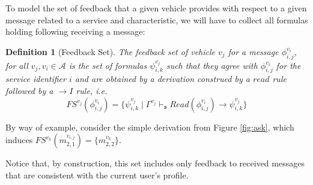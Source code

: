 \documentclass[compsoc, conference, letterpaper, 10pt, times]{IEEEtran}
\newtheorem{definition}{Definition}
\begin{document}
To model the set of feedback that a given vehicle provides with respect to a given message related to a service and characteristic, we will have to collect all formulas holding following receiving a message:

\begin{definition}[Feedback Set]
The feedback set of vehicle $v_{j}$ for a message $\phi^{v_{i}}_{i,j}$, for all $v_{j}, v_{i} \in \mathcal{A}$ is the set of formulas $\psi^{v_{j}}_{i,k}$ such that they agree with $\phi^{v_{i}}_{i,j}$ for the service identifier $i$ and are obtained by a derivation construed by a $read$ rule followed by a $\rightarrow I$ rule, i.e.
%
\[
FS^{v_{j}}(\phi^{v_{i}}_{i,j})=\{ \psi^{v_{j}}_{i,k}\mid \Gamma^{v_{j}}
\vdash_{\mathtt{s}}  Read(\phi^{v_{i}}_{i,j})\rightarrow \psi^{v_{j}}_{i,k}  \}
\]
\end{definition}
By way of example, consider the simple derivation from Figure \ref{fig:ask}, which induces $FS^{v_{k}}(m^{v_{i,j}}_{2,1})=\{m^{v_{k}}_{2,2}\}$.

\begin{figure*}[h]
\begin{footnotesize}

	\begin{prooftree}
		
		\end{prooftree}
\end{footnotesize}
\caption{An Example Feedback Set}\label{fig:ask}
\vspace{-2mm}
\end{figure*}


Notice that, by construction, this set includes only feedback to received messages that are consistent with the current user's profile. 
\end{document}
